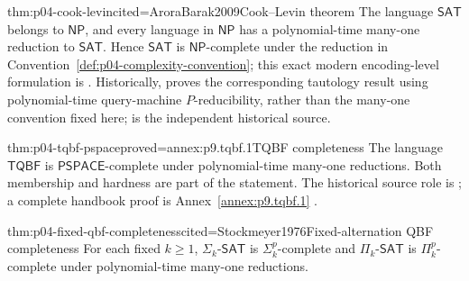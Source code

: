 \begin{hbtheorem}{thm:p04-cook-levin}{cited=AroraBarak2009}{Cook--Levin theorem}
The language \(\mathsf{SAT}\) belongs to \(\mathsf{NP}\), and every language
in \(\mathsf{NP}\) has a polynomial-time many-one reduction to
\(\mathsf{SAT}\).  Hence \(\mathsf{SAT}\) is \(\mathsf{NP}\)-complete under
the reduction in Convention~\ref{def:p04-complexity-convention}; this exact
modern encoding-level formulation is \cite[thm.~2.10]{AroraBarak2009}.
Historically, \textcite{Cook1971} proves the corresponding tautology result
using polynomial-time query-machine \(P\)-reducibility, rather than the
many-one convention fixed here; \textcite{Levin1973} is the independent
historical source.
\end{hbtheorem}

\begin{hbtheorem}{thm:p04-tqbf-pspace}{proved=annex:p9.tqbf.1}{TQBF completeness}
The language \(\mathsf{TQBF}\) is \(\mathsf{PSPACE}\)-complete under
polynomial-time many-one reductions.  Both membership and hardness are part
of the statement.  The historical source role is
\textcite{StockmeyerMeyer1973}; a complete handbook proof is
Annex~\ref{annex:p9.tqbf.1} \cite[thm.~4.11]{AroraBarak2009}.
\end{hbtheorem}

\begin{hbtheorem}{thm:p04-fixed-qbf-completeness}{cited=Stockmeyer1976}{Fixed-alternation QBF completeness}
For each fixed \(k\geq1\),
\(\Sigma_k\text{-}\mathsf{SAT}\) is \(\Sigma^p_k\)-complete and
\(\Pi_k\text{-}\mathsf{SAT}\) is \(\Pi^p_k\)-complete under
polynomial-time many-one reductions.
\end{hbtheorem}

